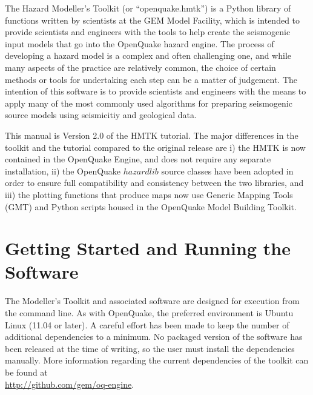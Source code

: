 The Hazard Modeller's Toolkit (or ``openquake.hmtk'') is a Python library of functions written by scientists at the GEM Model Facility, which is intended to provide 
scientists and engineers with the tools to help create the seismogenic 
input models that go into the OpenQuake hazard engine. The process of 
developing a hazard model is a complex and often challenging 
one, and while many aspects of the practice are relatively common, the 
choice of certain methods or tools for undertaking each step can be a 
matter of judgement. The intention of this software is to provide 
scientists and engineers with the means to apply many of the most 
commonly used algorithms for preparing seismogenic source models 
using seismicitiy and geological data. 

This manual is Version 2.0 of the HMTK tutorial. The major differences in the toolkit and the tutorial compared to the original release are i) the HMTK is now contained in the OpenQuake Engine, and does not require any separate installation, ii) the OpenQuake $hazardlib$ source classes have been adopted in order to ensure full compatibility and consistency between the two libraries, and iii) the plotting functions that produce maps now use Generic Mapping Tools (GMT) and Python scripts housed in the OpenQuake Model Building Toolkit. 


\section{Getting Started and Running the Software}
The Modeller's Toolkit and associated software are designed for execution 
from the command line. As with OpenQuake, the preferred environment is 
Ubuntu Linux (11.04 or later). A careful effort has been made to keep 
the number of additional dependencies to a minimum. No packaged version of the software has been released at the time of writing, so the user must install the dependencies manually. More information regarding the current dependencies of the toolkit can be found at \hfill \\
\href{http://github.com/GEMScienceTools/openquake.hmtk}{http://github.com/gem/oq-engine}. 

